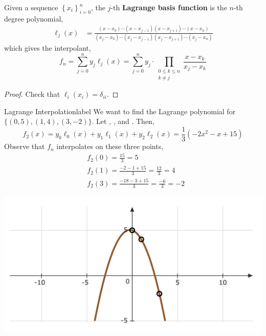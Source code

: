 \begin{thm}
   \noindent Given a sequence $\left\{x_i\right\}_{i=0}^n$, the $j$-th \textbf{Lagrange basis function} is the $n$-th degree polynomial,
   \begin{align*}
       \ell_j(x)&=\frac{\left(x-x_0\right) \cdots\left(x-x_{j-1}\right)\left(x-x_{j+1}\right) \cdots\left(x-x_n\right)}{\left(x_j-x_0\right) \cdots\left(x_j-x_{j-1}\right)\left(x_j-x_{j+1}\right) \cdots\left(x_j-x_n\right)}
   \end{align*}
   which gives the interpolant,
   \[f_n = \sum_{j=0}^n y_j \ell_j(x) = \sum_{j=0}^n y_j \cdot \prod_{\substack{0 \leq k \leq n \\ k \neq j}} \frac{x-x_k}{x_j-x_k}\]
\end{thm}

\begin{proof}
    Check that $\ell_i\left(x_i\right)=\delta_{i i}$.
\end{proof}

\begin{ex}{Lagrange Interpolation}{label}
    We want to find the Lagrange polynomial for $\{(0,5),(1,4),(3,-2)\}$. Let , , and . Then,
    \[f_2(x)=y_0 \ell_0(x)+y_1 \ell_1(x)+y_2 \ell_2(x) = \frac{1}{3}\left(-2 x^2-x+15\right)\]
    Observe that $f_n$ interpolates on these three points,
    \begin{align*}
        &f_2(0)=\frac{15}{3}=5 \\
        &f_2(1)=\frac{-2-1+15}{3}=\frac{12}{3}=4 \\
        &f_2(3)=\frac{-18-3+15}{3}=\frac{-6}{3}=-2
        \end{align*}
    \begin{center}
    \includegraphics[width=\textwidth]{figures/fig-11.png}
    \end{center}
\end{ex}